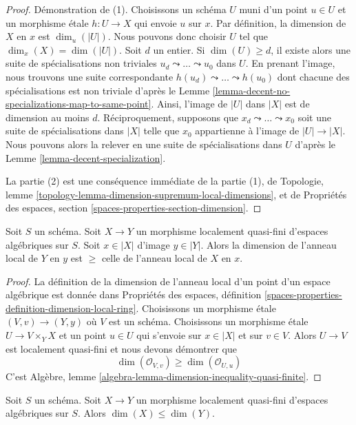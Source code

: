 \begin{proof}
Démonstration de (1). Choisissons un schéma $U$ muni d'un point $u \in U$
et un morphisme \'etale $h : U \to X$ qui envoie $u$ sur $x$.
Par définition, la dimension de $X$ en $x$ est $\dim_u(|U|)$.
Nous pouvons donc choisir $U$ tel que $\dim_x(X) = \dim(|U|)$.
Soit $d$ un entier. Si $\dim(U) \geq d$, il existe alors
une suite de spécialisations non triviales
$u_d \leadsto \ldots \leadsto u_0$ dans $U$. En prenant l'image,
nous trouvons une suite correspondante
$h(u_d) \leadsto \ldots \leadsto h(u_0)$
dont chacune des spécialisations est non triviale d'après le
Lemme \ref{lemma-decent-no-specializations-map-to-same-point}.
Ainsi, l'image de $|U|$ dans $|X|$ est de dimension au moins $d$.
Réciproquement, supposons que $x_d \leadsto \ldots \leadsto x_0$ soit une
suite de spécialisations dans $|X|$ telle que $x_0$ appartienne à l'image de
$|U| \to |X|$. Nous pouvons alors la relever en une suite de spécialisations
dans $U$ d'après le Lemme \ref{lemma-decent-specialization}.

\medskip\noindent
La partie (2) est une conséquence immédiate de la partie (1),
de Topologie, lemme \ref{topology-lemma-dimension-supremum-local-dimensions},
et de Propriétés des espaces, section
\ref{spaces-properties-section-dimension}.
\end{proof}

\begin{lemma}
\label{lemma-dimension-local-ring-quasi-finite}
Soit $S$ un schéma. Soit $X \to Y$ un morphisme localement quasi-fini
d'espaces algébriques sur $S$. Soit $x \in |X|$ d'image $y \in |Y|$.
Alors la dimension de l'anneau local de $Y$ en $y$ est $\geq$ celle de
l'anneau local de $X$ en $x$.
\end{lemma}

\begin{proof}
La définition de la dimension de l'anneau local d'un point d'un espace
algébrique est donnée dans Propriétés des espaces, définition
\ref{spaces-properties-definition-dimension-local-ring}.
Choisissons un morphisme \'etale $(V, v) \to (Y, y)$ où $V$ est un schéma.
Choisissons un morphisme \'etale $U \to V \times_Y X$ et un point $u \in U$
qui s'envoie sur $x \in |X|$ et sur $v \in V$. Alors $U \to V$ est localement
quasi-fini et nous devons démontrer que
$$
\dim(\mathcal{O}_{V, v}) \geq \dim(\mathcal{O}_{U, u})
$$
C'est Algèbre, lemme \ref{algebra-lemma-dimension-inequality-quasi-finite}.
\end{proof}

\begin{lemma}
\label{lemma-dimension-quasi-finite}
Soit $S$ un schéma. Soit $X \to Y$ un morphisme localement quasi-fini
d'espaces algébriques sur $S$. Alors $\dim(X) \leq \dim(Y)$.
\end{lemma}

